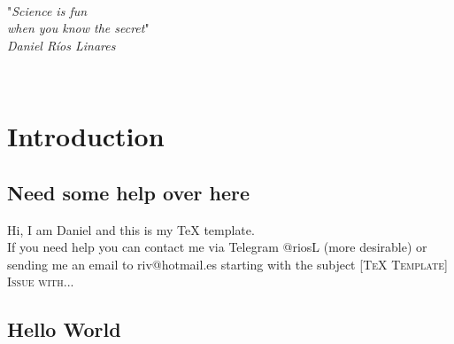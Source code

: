 \documentclass[11pt,openright,a4paper,english]{book} %
\begin{document}
\cleardoublepage
~\vfill
\begin{flushright}
"\textit{Science is fun} \\
\textit{when you know the secret}" \\
\textit{Daniel Ríos Linares}
\end{flushright}
\vfill ~


\cleardoublepage
{}

\pagestyle{fancy}

\cleardoublepage
\tableofcontents
\cleardoublepage

\setcounter{page}{1}




\chapter{Introduction}

\section{Need some help over here}

Hi, I am Daniel and this is my TeX template. \\

If you need help you can contact me via Telegram \textsf{@riosL} (more desirable) or sending me an email to \textsf{riv@hotmail.es} starting with the subject \textsc{[TeX Template] Issue with...} \\

\section{Hello World}
\end{document}
